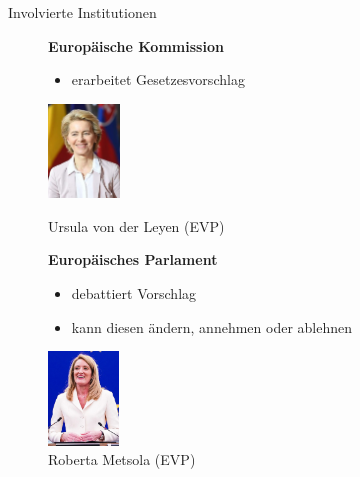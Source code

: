 \documentclass{beamer}
\begin{document}
\begin{frame}{Involvierte Institutionen}
    \begin{figure}[!htb]
    \begin{minipage}[t]{0.32\textwidth}
        \begin{center}
        \vspace{-0.75cm}
        {\footnotesize \textbf{Europäische Kommission}}
        
        \begin{itemize}
            \item {\scriptsize erarbeitet Gesetzesvorschlag}
        \end{itemize} 
        \vspace{1.1cm}
        \includegraphics[height=2.5cm]{Bilder/vdl.png}
        \caption*{\tiny Ursula von der Leyen (EVP)}
        \end{center}
    \end{minipage}\hfill
    \begin{minipage}[t]{0.32\textwidth}
        \begin{center}
        \vspace{-0.75cm}
        {\footnotesize \textbf{Europäisches Parlament}}
        \newline
        \begin{itemize}
            \item {\scriptsize debattiert Vorschlag}
            \item {\scriptsize kann diesen ändern, annehmen oder ablehnen}
        \end{itemize}
        \vspace{0.1cm}
        \includegraphics[height=2.5cm]{Bilder/metsola.png}
        \caption*{\tiny Roberta Metsola (EVP)}
        \end{center}
    \end{minipage}\hfill
    \begin{minipage}[t]{0.32\textwidth}
        \begin{center}

\end{center}
\end{minipage}
\end{figure}
\end{frame}
\end{document}
